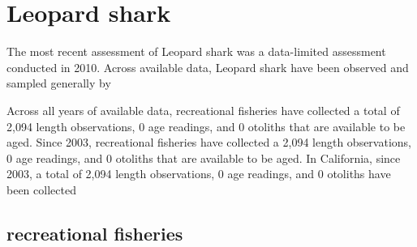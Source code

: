 \documentclass[11pt,
  english,
  letterpaper,
]{article}
\begin{document}

\hypertarget{leopard-shark}{%
\section{Leopard shark}\label{leopard-shark}}

\leavevmode\tagmcend\tagstructend


The most recent assessment of Leopard shark was a data-limited assessment conducted in 2010. Across available data, Leopard shark have been observed and sampled generally by

\leavevmode\tagmcend\tagstructend\par


Across all years of available data, recreational fisheries have collected a total of 2,094 length observations, 0 age readings, and 0 otoliths that are available to be aged. Since 2003, recreational fisheries have collected a 2,094 length observations, 0 age readings, and 0 otoliths that are available to be aged. In California, since 2003, a total of 2,094 length observations, 0 age readings, and 0 otoliths have been collected

\leavevmode\tagmcend\tagstructend\par


\hypertarget{recreational-fisheries-20}{%
\subsection{recreational fisheries}\label{recreational-fisheries-20}}

\leavevmode\tagmcend\tagstructend


\begingroup\fontsize{10}{12}\selectfont \begingroup\fontsize{10}{12}\selectfont

\leavevmode\tagmcend\tagstructend\par
\end{document}
